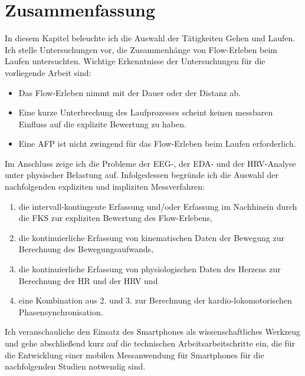 

\section{Zusammenfassung} 

\label{sec:zusammenfassung_4}

In diesem Kapitel beleuchte ich die Auswahl der Tätigkeiten Gehen und Laufen. Ich stelle Untersuchungen vor, die Zusammenhänge von Flow-Erleben beim Laufen untersuchten. Wichtige Erkenntnisse der Untersuchungen für die vorliegende Arbeit sind: 
\begin{itemize}

	\item Das Flow-Erleben nimmt mit der Dauer oder der Distanz ab.

	\item Eine kurze Unterbrechung des Laufprozesses scheint keinen messbaren Einfluss auf die explizite Bewertung zu haben. 

	\item Eine \ac{AFP} ist nicht zwingend für das Flow-Erleben beim Laufen erforderlich.
	
\end{itemize}

	Im Anschluss zeige ich die Probleme der \ac{EEG}-, der \ac{EDA}- und der \ac{HRV}-Analyse unter physischer Belastung auf. Infolgedessen begründe ich die Auswahl der nachfolgenden expliziten und impliziten Messverfahren:
	
\begin{enumerate}

	\item die intervall-kontingente Erfassung und/oder Erfassung im Nachhinein durch die \ac{FKS} zur expliziten Bewertung des Flow-Erlebens, 

	\item die kontinuierliche Erfassung von kinematischen Daten der Bewegung zur Berechnung des Bewegungsaufwands, 

	\item die kontinuierliche Erfassung von physiologischen Daten des Herzens zur Berechnung der \ac{HR} und der \ac{HRV} und 

	\item eine Kombination aus 2. und 3. zur Berechnung der kardio-lokomotorischen Phasensynchronisation.
\end{enumerate}

Ich veranschauliche den Einsatz des Smartphones als wissenschaftliches Werkzeug und gehe abschließend kurz auf die technischen Arbeitsarbeitschritte ein, die für die Entwicklung einer mobilen Messanwendung für Smartphones für die nachfolgenden Studien notwendig sind.

